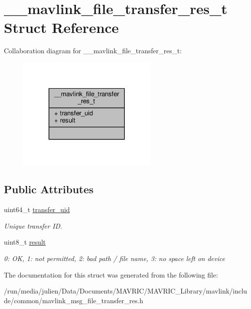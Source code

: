 \hypertarget{struct____mavlink__file__transfer__res__t}{\section{\+\_\+\+\_\+mavlink\+\_\+file\+\_\+transfer\+\_\+res\+\_\+t Struct Reference}
\label{struct____mavlink__file__transfer__res__t}
}


Collaboration diagram for \+\_\+\+\_\+mavlink\+\_\+file\+\_\+transfer\+\_\+res\+\_\+t\+:
\nopagebreak
\begin{figure}[H]
\begin{center}
\leavevmode
\includegraphics[width=197pt]{struct____mavlink__file__transfer__res__t__coll__graph}
\end{center}
\end{figure}
\subsection*{Public Attributes}
\begin{DoxyCompactItemize}
\item 
\hypertarget{struct____mavlink__file__transfer__res__t_ad8bbb4a8938103052075ed7f83b86eb8}{uint64\+\_\+t \hyperlink{struct____mavlink__file__transfer__res__t_ad8bbb4a8938103052075ed7f83b86eb8}{transfer\+\_\+uid}}\label{struct____mavlink__file__transfer__res__t_ad8bbb4a8938103052075ed7f83b86eb8}

\begin{DoxyCompactList}\small\item\em Unique transfer I\+D. \end{DoxyCompactList}\item 
\hypertarget{struct____mavlink__file__transfer__res__t_aac039b656fe7911fa9452bff8e9540b5}{uint8\+\_\+t \hyperlink{struct____mavlink__file__transfer__res__t_aac039b656fe7911fa9452bff8e9540b5}{result}}\label{struct____mavlink__file__transfer__res__t_aac039b656fe7911fa9452bff8e9540b5}

\begin{DoxyCompactList}\small\item\em 0\+: O\+K, 1\+: not permitted, 2\+: bad path / file name, 3\+: no space left on device \end{DoxyCompactList}\end{DoxyCompactItemize}


The documentation for this struct was generated from the following file\+:\begin{DoxyCompactItemize}
\item 
/run/media/julien/\+Data/\+Documents/\+M\+A\+V\+R\+I\+C/\+M\+A\+V\+R\+I\+C\+\_\+\+Library/mavlink/include/common/mavlink\+\_\+msg\+\_\+file\+\_\+transfer\+\_\+res.\+h\end{DoxyCompactItemize}
